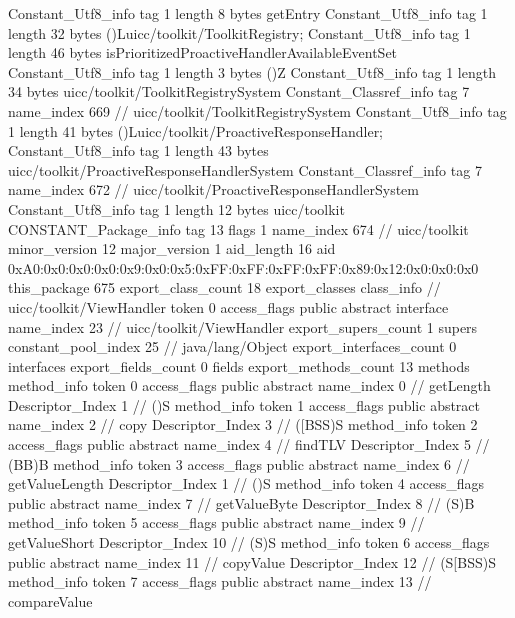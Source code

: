 {{		Constant_Utf8_info {
			tag	1
			length	8
			bytes	getEntry
		}
		Constant_Utf8_info {
			tag	1
			length	32
			bytes	()Luicc/toolkit/ToolkitRegistry;
		}
		Constant_Utf8_info {
			tag	1
			length	46
			bytes	isPrioritizedProactiveHandlerAvailableEventSet
		}
		Constant_Utf8_info {
			tag	1
			length	3
			bytes	()Z
		}
		Constant_Utf8_info {
			tag	1
			length	34
			bytes	uicc/toolkit/ToolkitRegistrySystem
		}
		Constant_Classref_info {
			tag	7
			name_index	669		// uicc/toolkit/ToolkitRegistrySystem
		}
		Constant_Utf8_info {
			tag	1
			length	41
			bytes	()Luicc/toolkit/ProactiveResponseHandler;
		}
		Constant_Utf8_info {
			tag	1
			length	43
			bytes	uicc/toolkit/ProactiveResponseHandlerSystem
		}
		Constant_Classref_info {
			tag	7
			name_index	672		// uicc/toolkit/ProactiveResponseHandlerSystem
		}
		Constant_Utf8_info {
			tag	1
			length	12
			bytes	uicc/toolkit
		}
		CONSTANT_Package_info {
			tag	13
			flags	1
			name_index	674		// uicc/toolkit
			minor_version	12
			major_version	1
			aid_length	16
			aid	0xA0:0x0:0x0:0x0:0x9:0x0:0x5:0xFF:0xFF:0xFF:0xFF:0x89:0x12:0x0:0x0:0x0
		}
	}
	this_package	675
	export_class_count	18
	export_classes {
		class_info {		// uicc/toolkit/ViewHandler
			token	0
			access_flags	public abstract interface
			name_index	23		// uicc/toolkit/ViewHandler
			export_supers_count	1
			supers {
				constant_pool_index	25		// java/lang/Object
			}
			export_interfaces_count	0
			interfaces {
			}
			export_fields_count	0
			fields {
			}
			export_methods_count	13
			methods {
				method_info {
					token	0
					access_flags	public abstract
					name_index	0		// getLength
					Descriptor_Index	1		// ()S
				}
				method_info {
					token	1
					access_flags	public abstract
					name_index	2		// copy
					Descriptor_Index	3		// ([BSS)S
				}
				method_info {
					token	2
					access_flags	public abstract
					name_index	4		// findTLV
					Descriptor_Index	5		// (BB)B
				}
				method_info {
					token	3
					access_flags	public abstract
					name_index	6		// getValueLength
					Descriptor_Index	1		// ()S
				}
				method_info {
					token	4
					access_flags	public abstract
					name_index	7		// getValueByte
					Descriptor_Index	8		// (S)B
				}
				method_info {
					token	5
					access_flags	public abstract
					name_index	9		// getValueShort
					Descriptor_Index	10		// (S)S
				}
				method_info {
					token	6
					access_flags	public abstract
					name_index	11		// copyValue
					Descriptor_Index	12		// (S[BSS)S
				}
				method_info {
					token	7
					access_flags	public abstract
					name_index	13		// compareValue
}}}}}

